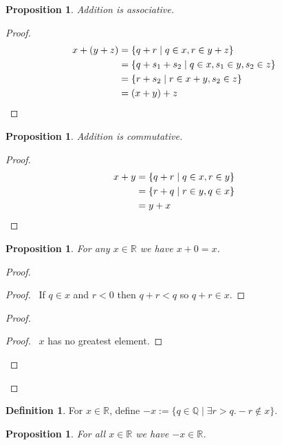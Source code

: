\documentclass{book}
\let\qed\relax
\newtheorem{prop}[ax]{Proposition}
\theoremstyle{definition}
\newtheorem{df}[ax]{Definition}
\begin{document}
\begin{prop}
Addition is associative.
\end{prop}

\begin{proof}
\pf
\begin{align*}
x + (y + z) & = \{ q + r \mid q \in x, r \in y + z \} \\
& = \{ q + s_1 + s_2 \mid q \in x, s_1 \in y, s_2 \in z \} \\
& = \{ r + s_2 \mid r \in x + y, s_2 \in z \} \\
& = (x + y) + z & \qed
\end{align*}
\end{proof}

\begin{prop}
Addition is commutative.
\end{prop}

\begin{proof}
\pf
\begin{align*}
x + y & = \{ q + r \mid q \in x, r \in y \} \\
& = \{ r + q \mid r \in y, q \in x \} \\
& = y + x & \qed
\end{align*}
\end{proof}

\begin{prop}
For any $x \in \mathbb{R}$ we have $x + 0 = x$.
\end{prop}

\begin{proof}
\pf
{}
\begin{proof}
	\pf\ If $q \in x$ and $r < 0$ then $q + r < q$ so $q + r \in x$.
\end{proof}
\begin{proof}
	\begin{proof}
		\pf\ $x$ has no greatest element.
	\end{proof}
\end{proof}
\qed
\end{proof}

\begin{df}
For $x \in \mathbb{R}$, define $-x := \{ q \in \mathbb{Q} \mid \exists r > q. -r \notin x \}$.
\end{df}

\begin{prop}
For all $x \in \mathbb{R}$ we have $-x \in \mathbb{R}$.
\end{prop}
\end{document}
